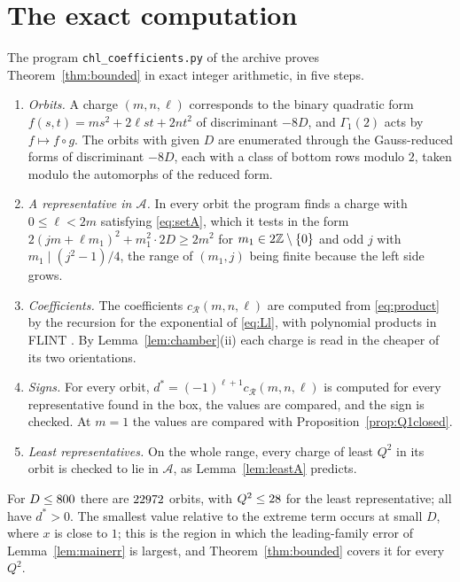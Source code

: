 \appendix

\section{The exact computation}\label{app:exact}

The program \texttt{chl\_coefficients.py} of the archive \cite{Bha26c} proves Theorem~\ref{thm:bounded} in exact integer arithmetic, in five steps.
\begin{enumerate}
\item[(B1)] \emph{Orbits.} A charge $(m,n,\ell)$ corresponds to the binary quadratic form $f(s,t)=ms^2+2\ell st+2nt^2$ of discriminant $-8D$, and $\Gamma_1(2)$ acts by $f\mapsto f\circ g$. The orbits with given $D$ are enumerated through the Gauss-reduced forms of discriminant $-8D$, each with a class of bottom rows modulo $2$, taken modulo the automorphs of the reduced form.
\item[(B2)] \emph{A representative in $\mathcal A$.} In every orbit the program finds a charge with $0\le\ell<2m$ satisfying \eqref{eq:setA}, which it tests in the form $2(jm+\ell m_1)^2+m_1^2\cdot2D\ge2m^2$ for $m_1\in2\mathbb{Z}\setminus\{0\}$ and odd $j$ with $m_1\mid(j^2-1)/4$, the range of $(m_1,j)$ being finite because the left side grows.
\item[(B3)] \emph{Coefficients.} The coefficients $c_{\mathcal R}(m,n,\ell)$ are computed from \eqref{eq:product} by the recursion for the exponential of \eqref{eq:Ll}, with polynomial products in FLINT \cite{Har10}. By Lemma~\ref{lem:chamber}(ii) each charge is read in the cheaper of its two orientations.
\item[(B4)] \emph{Signs.} For every orbit, $d^*=(-1)^{\ell+1}c_{\mathcal R}(m,n,\ell)$ is computed for every representative found in the box, the values are compared, and the sign is checked. At $m=1$ the values are compared with Proposition~\ref{prop:Q1closed}.
\item[(B5)] \emph{Least representatives.} On the whole range, every charge of least $Q^2$ in its orbit is checked to lie in $\mathcal A$, as Lemma~\ref{lem:leastA} predicts.
\end{enumerate}
For $D\le800$ there are $22972$ orbits, with $Q^2\le28$ for the least representative; all have $d^*>0$. The smallest value relative to the extreme term occurs at small $D$, where $x$ is close to $1$; this is the region in which the leading-family error of Lemma~\ref{lem:mainerr} is largest, and Theorem~\ref{thm:bounded} covers it for every $Q^2$.


